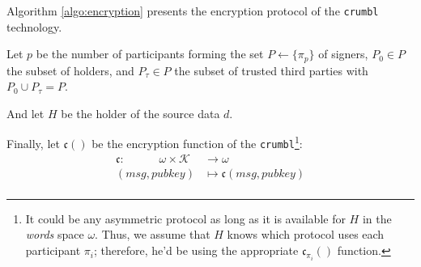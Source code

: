 \documentclass[twoside,twocolumn]{article}
\theoremstyle{definition}
\theoremstyle{remark}
\begin{document}
Algorithm \ref{algo:encryption} presents the encryption protocol of the \texttt{crumbl}\texttrademark~ technology.

\vspace{1em} %

Let $p$ be the number of participants forming the set $P \gets \{ \pi_p\}$ of signers, $P_0 \in P$ the subset of holders, and $P_\tau \in P$ the subset 
of trusted third parties with $P_0 \cup P_\tau = P$.

And let $H$ be the holder of the source data $d$.

Finally, let $\mathfrak{c}()$ be the encryption function of the \texttt{crumbl}\footnote{It could be any asymmetric protocol as long as it is available 
for $H$ in the \emph{words} space $\omega$. Thus, we assume that $H$ knows which protocol uses each participant $\pi_i$; therefore, he'd be using the 
appropriate $\mathfrak{c}_{\pi_i}()$ function.}:
\begin{equation}
    \label{eq:encrypt}
    \begin{array}{rl}
        \mathfrak{c}: \qquad \quad \omega \times \mathcal{K} &\to \omega \\
                (msg, pubkey) &\mapsto \mathfrak{c}(msg, pubkey) \\
    \end{array}
\end{equation}
\end{document}
